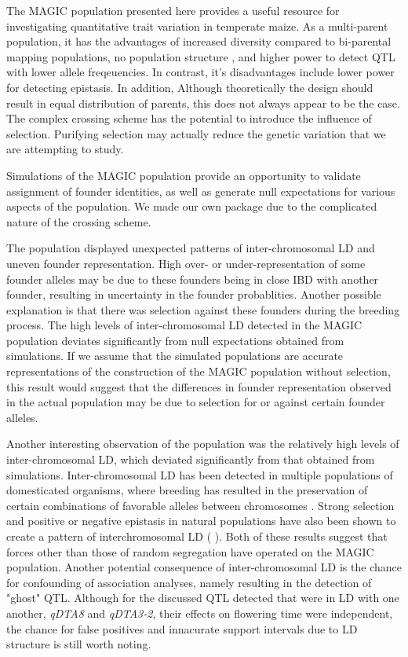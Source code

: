 \documentclass[article,9pt,twocolumn,twoside]{rilabRxiv}
\begin{document}
The MAGIC population presented here provides a useful resource for investigating quantitative trait variation in temperate maize.
As a multi-parent population, it has the advantages of increased diversity compared to bi-parental mapping populations, no population structure , and higher power to detect QTL with lower allele freqeuencies.
In contrast, it's disadvantages include lower power for detecting epistasis. In addition, Although theoretically the design should result in equal distribution of parents, this does not always appear to be the case.
The complex crossing scheme has the potential to introduce the influence of selection.
Purifying selection may actually reduce the genetic variation that we are attempting to study.

Simulations of the MAGIC population provide an opportunity to validate assignment of founder identities, as well as generate null expectations for various aspects of the population.
We made our own package due to the complicated nature of the crossing scheme.

The population displayed unexpected patterns of inter-chromosomal LD and uneven founder representation.
High over- or under-representation of some founder alleles may be due to these founders being in close IBD with another founder, resulting in uncertainty in the founder probablities.
Another possible explanation is that there was selection against these founders during the breeding process.
The high levels of inter-chromosomal LD detected in the MAGIC population deviates significantly from null expectations obtained from simulations.
If we assume that the simulated populations are accurate representations of the construction of the MAGIC population without selection, this result would suggest that the differences in founder representation observed in the actual population may be due to selection for or against certain founder alleles.

Another interesting observation of the population was the relatively high levels of inter-chromosomal LD, which deviated significantly from that obtained from simulations.
Inter-chromosomal LD has been detected in multiple populations of domesticated organisms, where breeding has resulted in the preservation of certain combinations of favorable alleles between chromosomes \cite{Robbins} \cite{MalyshevaOtto}.
Strong selection and positive or negative epistasis in natural populations have also been shown to create a pattern of interchromosomal LD (\cite{Kulminski} \cite{Gupta} \cite{Hench} \cite{Petkov}).
Both of these results suggest that forces other than those of random segregation have operated on the MAGIC population.
Another potential consequence of inter-chromosomal LD is the chance for confounding of association analyses, namely resulting in the detection of "ghost" QTL.
Although for the discussed QTL detected that were in LD with one another, \emph{qDTA8} and \emph{qDTA3-2}, their effects on flowering time were independent, the chance for false positives and innacurate support intervals due to LD structure is still worth noting.
\end{document}
